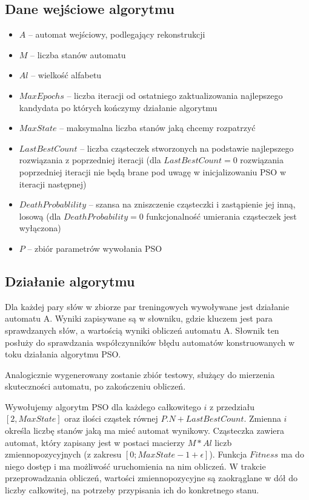 \documentclass{../llncs_template_final/llncs}
\begin{document}
\newpage

\subsection{Dane wejściowe algorytmu}
\begin{itemize}
\item $A$ -- automat wejściowy, podlegający rekonstrukcji
\item $M$ -- liczba stanów automatu
\item $Al$ -- wielkość alfabetu
\item $MaxEpochs$ -- liczba iteracji od ostatniego zaktualizowania najlepszego kandydata po których kończymy działanie algorytmu
\item $MaxState$ -- maksymalna liczba stanów jaką chcemy rozpatrzyć
\item $LastBestCount$ -- liczba cząsteczek stworzonych na podstawie najlepszego rozwiązania z poprzedniej iteracji (dla $LastBestCount = 0$ rozwiązania poprzedniej iteracji nie będą brane pod uwagę w inicjalizowaniu PSO w iteracji następnej)
\item $DeathProbablility$ -- szansa na zniszczenie cząsteczki i zastąpienie jej inną, losową (dla $DeathProbability = 0$ funkcjonalność umierania cząsteczek jest wyłączona)
\item $P$ -- zbiór parametrów wywołania PSO
\end{itemize}

\subsection{Działanie algorytmu}

Dla każdej pary słów w zbiorze par treningowych wywoływane jest działanie automatu A. Wyniki zapisywane są w słowniku, gdzie kluczem jest para sprawdzanych słów, a wartością wyniki obliczeń automatu A. Słownik ten posłuży do sprawdzania współczynników błędu automatów konstruowanych w toku działania algorytmu PSO.

Analogicznie wygenerowany zostanie zbiór testowy, służący do mierzenia skuteczności automatu, po zakończeniu obliczeń.

Wywołujemy algorytm PSO dla każdego całkowitego $i$ z przedziału $[2, MaxState]$ oraz ilości cząstek równej $P.N + LastBestCount$. Zmienna $i$ określa liczbę stanów jaką ma mieć automat wynikowy. Cząsteczka zawiera automat, który zapisany jest w postaci macierzy $M * Al$ liczb zmiennopozycyjnych (z zakresu $[0; MaxState - 1 + \epsilon]$). Funkcja $Fitness$ ma do niego dostęp i ma możliwość uruchomienia na nim obliczeń. W trakcie przeprowadzania obliczeń, wartości zmiennopozycyjne są zaokrąglane w dół do liczby całkowitej, na potrzeby przypisania ich do konkretnego stanu. 
\end{document}
